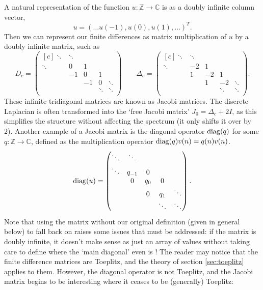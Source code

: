 \documentclass[../main.tex]{subfiles}
\begin{document}
A natural representation of the function $u: \mathbb{Z} \rightarrow \mathbb{C}$
is as a doubly infinite column vector, $$u = (\hdots u(-1), u(0), u(1),\hdots)^T.$$
Then we can represent our finite differences as matrix multiplication of $u$
by a doubly infinite matrix, such as
  $$ 
  D_c = 
  \begin{pmatrix*}[c]
    \ddots & \ddots & & & \\
    \ddots & 0 & 1 & & \\
    & -1 & 0 & 1 & \\
    & & -1 & 0 & \ddots \\
    & & & \ddots & \ddots \\
  \end{pmatrix*}
  \quad\quad
  \Delta_c = 
  \begin{pmatrix*}[c] 
    \ddots & \ddots & & & \\
    \ddots & -2 & 1 & & \\
    & 1 & -2 & 1 & \\
    & & 1 & -2 & \ddots \\
    & & & \ddots & \ddots \\
  \end{pmatrix*}. 
  $$
These infinite tridiagonal matrices are known as Jacobi matrices. The discrete
Laplacian is often transformed into the `free Jacobi matrix' $J_0 = \Delta_c +
2I$, as this simplifies the structure without affecting the spectrum (it only
shifts it over by 2). Another example of a Jacobi matrix is the diagonal
operator $\mathrm{diag}(q)$ for some $q: \mathbb{Z} \rightarrow \mathbb{C}$, defined as
the multiplication operator $\mathrm{diag}(q)v(n) = q(n)v(n)$.
  $$ 
  \diag(u) = 
  \begin{pmatrix*}[c]
    \ddots & \ddots & & & \\
    \ddots & q_{-1} & 0 & & \\
    & 0 & q_0 & 0 & \\
    & & 0 & q_1 & \ddots \\
    & & & \ddots & \ddots \\
  \end{pmatrix*}.
  $$
Note that using the matrix without our original definition (given in general
below) to fall back on raises some issues that must be addressed: if the matrix
is doubly infinite, it doesn't make sense as just an array of values without
taking care to define where the `main diagonal' even is \cite{lindner2013where}!
The reader may notice that the finite difference matrices are Toeplitz, and the
theory of section \ref{sec:toeplitz} applies to them. However, the diagonal
operator is not Toeplitz, and the Jacobi matrix begins to be interesting where
it ceases to be (generally) Toeplitz:
\end{document}
